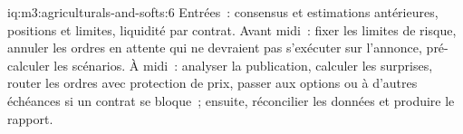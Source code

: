 \begin{solution}{iq:m3:agriculturals-and-softs:6}
Entrées~: consensus et estimations antérieures, positions et limites, liquidité par contrat. Avant midi~: fixer les
limites de risque, annuler les ordres en attente qui ne devraient pas s'exécuter sur l'annonce, pré-calculer les scénarios. À midi~: analyser la
publication, calculer les surprises, router les ordres avec protection de prix, passer aux options ou à d'autres échéances si un
contrat se bloque~; ensuite, réconcilier les données et produire le rapport.
\end{solution}
